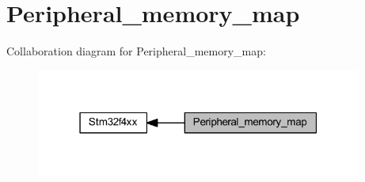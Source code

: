 \hypertarget{group___peripheral__memory__map}{}\section{Peripheral\+\_\+memory\+\_\+map}
\label{group___peripheral__memory__map}
Collaboration diagram for Peripheral\+\_\+memory\+\_\+map\+:\nopagebreak
\begin{figure}[H]
\begin{center}
\leavevmode
\includegraphics[width=304pt]{group___peripheral__memory__map}
\end{center}
\end{figure}
